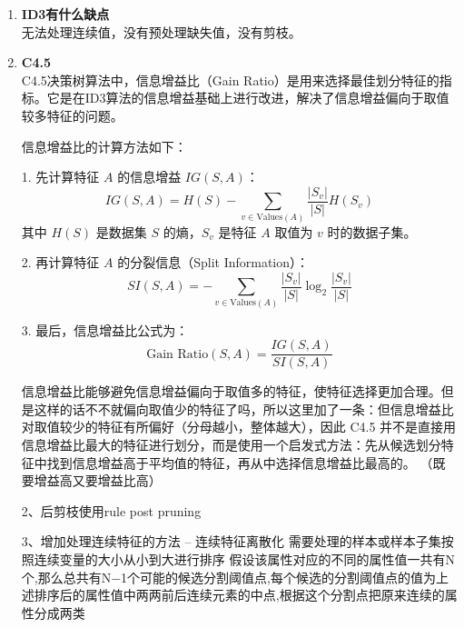 \documentclass{article}
\begin{document}
\begin{enumerate}
1. 把决策树转化为一系列规则，每个规则表示从根到叶节点的一条路径。例如：
   \texttt{if (outlook=sunny) $\wedge$ (humidity=high) then playTennis = no}

2. 对每条规则，逐步去除规则中的前提条件（即从规则中移除某些节点），判断去除条件后规则在验证集上的准确率是否提升。如果提升，则移除该条件。例如：
   \texttt{if (outlook=sunny) then playTennis = no}

3. 按照规则的估计准确率（estimated accuracy）对所有规则进行排序。

4. 在决策树预测时，使用所有规则，在样本满足多个规则时，选择准确率最高的那条规则进行预测。

这种方法的目的是：通过简化规则，去掉不必要的条件，让决策树变得更简单，减少过拟合，提高在新数据上的表现。
\item \textbf{ID3有什么缺点}\\
无法处理连续值，没有预处理缺失值，没有剪枝。

\item \textbf{C4.5}\\
C4.5决策树算法中，信息增益比（Gain Ratio）是用来选择最佳划分特征的指标。它是在ID3算法的信息增益基础上进行改进，解决了信息增益偏向于取值较多特征的问题。

信息增益比的计算方法如下：

1. 先计算特征 $A$ 的信息增益 $IG(S, A)$：
   $$
   IG(S, A) = H(S) - \sum_{v \in \text{Values}(A)} \frac{|S_v|}{|S|} H(S_v)
   $$
   其中 $H(S)$ 是数据集 $S$ 的熵，$S_v$ 是特征 $A$ 取值为 $v$ 时的数据子集。

2. 再计算特征 $A$ 的分裂信息（Split Information）：
   $$
   SI(S, A) = -\sum_{v \in \text{Values}(A)} \frac{|S_v|}{|S|} \log_2 \frac{|S_v|}{|S|}
   $$

3. 最后，信息增益比公式为：
   $$
   \text{Gain Ratio}(S, A) = \frac{IG(S, A)}{SI(S, A)}
   $$

信息增益比能够避免信息增益偏向于取值多的特征，使特征选择更加合理。但是这样的话不不就偏向取值少的特征了吗，所以这里加了一条：但信息增益比对取值较少的特征有所偏好（分母越小，整体越大），因此 C4.5 并不是直接用信息增益比最大的特征进行划分，而是使用一个启发式方法：先从候选划分特征中找到信息增益高于平均值的特征，再从中选择信息增益比最高的。
（既要增益高又要增益比高）

2、后剪枝使用rule post pruning

3、增加处理连续特征的方法 -- 连续特征离散化
需要处理的样本或样本子集按照连续变量的大小从小到大进行排序
假设该属性对应的不同的属性值一共有N个,那么总共有N−1个可能的候选分割阈值点,每个候选的分割阈值点的值为上述排序后的属性值中两两前后连续元素的中点,根据这个分割点把原来连续的属性分成两类


\end{enumerate}
\end{document}
